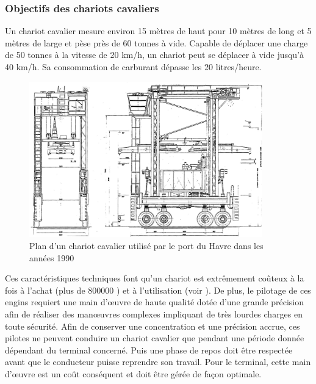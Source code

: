 \subsubsection{Objectifs des chariots cavaliers}

Un chariot cavalier mesure environ 15 mètres de haut pour 10 mètres de long et 5 mètres de large et pèse près de 60 tonnes à vide.
Capable de déplacer une charge de 50 tonnes à la vitesse de 20 km/h, un chariot peut se déplacer à vide jusqu'à 40 km/h.
Sa consommation de carburant dépasse les 20 litres/heure. 

\begin{figure}[ht]
  \begin{center}
   \includegraphics[width=0.9\textwidth]{chapitres/application/planSC.jpg}
   \caption{Plan d'un chariot cavalier utilisé par le port du Havre dans les années 1990}
   \label{fig:application:planSC}
  \end{center}
\end{figure}

Ces caractéristiques techniques font qu'un chariot est extrêmement coûteux à la fois à l'achat (plus de 800000 \geneuro) et à l'utilisation (voir \cite{Huang2003}).
De plus, le pilotage de ces engins requiert une main d'\oe uvre de haute qualité dotée d'une grande précision afin de réaliser des manœuvres complexes impliquant de très lourdes charges en toute sécurité.
Afin de conserver une concentration et une précision accrue, ces pilotes ne peuvent conduire un chariot cavalier que pendant une période donnée dépendant du terminal concerné. Puis une phase de repos doit être respectée avant que le conducteur puisse reprendre son travail. Pour le terminal, cette main d'\oe uvre est un coût conséquent et doit être gérée de façon optimale.

